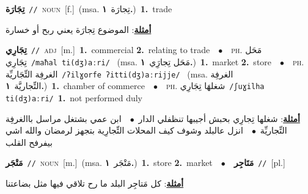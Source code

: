 \documentclass[10pt,a4paper,twoside]{article} %
\begin{document}
\begin{multicols}{2}
{{{\setlength\topsep{0pt}\textbf{\foreignlanguage{arabic}{تِجَارَة}}\ {\color{gray}\texttt{//}\color{black}}\ \textsc{noun}\ [f.]\ \color{gray}(msa. \foreignlanguage{arabic}{تِجارَة}~\foreignlanguage{arabic}{\textbf{١.}})\color{black}\ \textbf{1.}~trade\  \begin{flushright}\color{gray}\foreignlanguage{arabic}{\textbf{\underline{\foreignlanguage{arabic}{أمثلة}}}: الموضوع تِجارَة يعني ربح أو خسارة}\end{flushright}\color{black}} \vspace{2mm}

{\setlength\topsep{0pt}\textbf{\foreignlanguage{arabic}{تِجَارِي}}\ {\color{gray}\texttt{//}\color{black}}\ \textsc{adj}\ [m.]\ \textbf{1.}~commercial  \textbf{2.}~relating to trade\ \ $\bullet$\ \ \textsc{ph.} \color{gray} \foreignlanguage{arabic}{مَحَل تِجَارِي}\color{black}\ {\color{gray}\texttt{/{\sffamily maħal ti(dʒ)aːri}/}\color{black}}\ \color{gray} (msa. \foreignlanguage{arabic}{مَحَل تِجارَِي}~\foreignlanguage{arabic}{\textbf{١.}})\color{black}\ \textbf{1.}~market  \textbf{2.}~store\ \ $\bullet$\ \ \textsc{ph.} \color{gray} \foreignlanguage{arabic}{الغرفِة التِّجَاريِّة}\color{black}\ {\color{gray}\texttt{/{\sffamily ʔilɣorfe ʔitti(dʒ)aːrijje}/}\color{black}}\ \color{gray} (msa. \foreignlanguage{arabic}{الغرفِة التِّجاريَّة}~\foreignlanguage{arabic}{\textbf{١.}})\color{black}\ \textbf{1.}~chamber of commerce\ \ $\bullet$\ \ \textsc{ph.} \color{gray} \foreignlanguage{arabic}{شغلهَا تِجَارِي}\color{black}\ {\color{gray}\texttt{/{\sffamily ʃuɣilha ti(dʒ)aːri}/}\color{black}}\ \textbf{1.}~not performed duly\  \begin{flushright}\color{gray}\foreignlanguage{arabic}{\textbf{\underline{\foreignlanguage{arabic}{أمثلة}}}: شغلها تِجارِي بحبش أجيبها تنظفلي الدار\ $\bullet$\ \  ابن عمي بشتغل مراسل باالغرفِة التِّجاريِّة\ $\bullet$\ \  انزل عالبلد وشوف كيف المحلات التِّجارِية بتجهز لرمضان والله اشي بيفرفح القلب}\end{flushright}\color{black}} \vspace{2mm}

{\setlength\topsep{0pt}\textbf{\foreignlanguage{arabic}{مَتْجَر}}\ {\color{gray}\texttt{//}\color{black}}\ \textsc{noun}\ [m.]\ \color{gray}(msa. \foreignlanguage{arabic}{مَتْجَر}~\foreignlanguage{arabic}{\textbf{١.}})\color{black}\ \textbf{1.}~store  \textbf{2.}~market\ \ $\bullet$\ \ \setlength\topsep{0pt}\textbf{\foreignlanguage{arabic}{مَتَاجِر}}\ {\color{gray}\texttt{//}\color{black}}\ [pl.]\  \begin{flushright}\color{gray}\foreignlanguage{arabic}{\textbf{\underline{\foreignlanguage{arabic}{أمثلة}}}: كل مَتاجِر البلد ما رح تلاقي فيها مثل بضاعتنا}\end{flushright}\color{black}} \vspace{2mm}

}}
\end{multicols}
\end{document}
